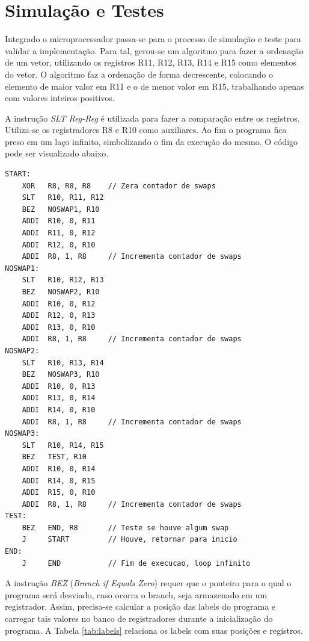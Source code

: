 \documentclass[11pt,a4paper,titlepage]{article}
\begin{document}
\section{Simulação e Testes}

Integrado o microprocessador passa-se para o processo de simulação e teste para validar a implementação. Para tal, gerou-se um algoritmo para fazer a ordenação de um vetor, utilizando os registros R11, R12, R13, R14 e R15 como elementos do vetor. O algoritmo faz a ordenação de forma decrescente, colocando o elemento de maior valor em R11 e o de menor valor em R15, trabalhando apenas com valores inteiros positivos.

A instrução \textit{SLT Reg-Reg} é utilizada para fazer a comparação entre os registros. Utiliza-se os registradores R8 e R10 como auxiliares. Ao fim o programa fica preso em um laço infinito, simbolizando o fim da execução do mesmo. O código pode ser visualizado abaixo.

\lstset{language=[mips]Assembler}
\begin{lstlisting}
START:
    XOR   R8, R8, R8    // Zera contador de swaps
    SLT   R10, R11, R12   
    BEZ   NOSWAP1, R10
    ADDI  R10, 0, R11
    ADDI  R11, 0, R12
    ADDI  R12, 0, R10
    ADDI  R8, 1, R8     // Incrementa contador de swaps
NOSWAP1:
    SLT   R10, R12, R13
    BEZ   NOSWAP2, R10
    ADDI  R10, 0, R12
    ADDI  R12, 0, R13
    ADDI  R13, 0, R10
    ADDI  R8, 1, R8     // Incrementa contador de swaps
NOSWAP2:
    SLT   R10, R13, R14
    BEZ   NOSWAP3, R10
    ADDI  R10, 0, R13
    ADDI  R13, 0, R14
    ADDI  R14, 0, R10
    ADDI  R8, 1, R8     // Incrementa contador de swaps
NOSWAP3:
    SLT   R10, R14, R15
    BEZ   TEST, R10
    ADDI  R10, 0, R14
    ADDI  R14, 0, R15
    ADDI  R15, 0, R10
    ADDI  R8, 1, R8     // Incrementa contador de swaps
TEST:
    BEZ   END, R8       // Teste se houve algum swap
    J     START         // Houve, retornar para inicio
END:
    J     END           // Fim de execucao, loop infinito
\end{lstlisting}

A instrução \textit{BEZ} (\textit{Branch if Equals Zero}) requer que o ponteiro para o qual o programa será desviado, caso ocorra o branch, seja armazenado em um registrador. Assim, precisa-se calcular a posição das labels do programa e carregar tais valores no banco de registradores durante a inicialização do programa. A Tabela \ref{tab:labels} relaciona os labels com suas posições e registros.
\end{document}
